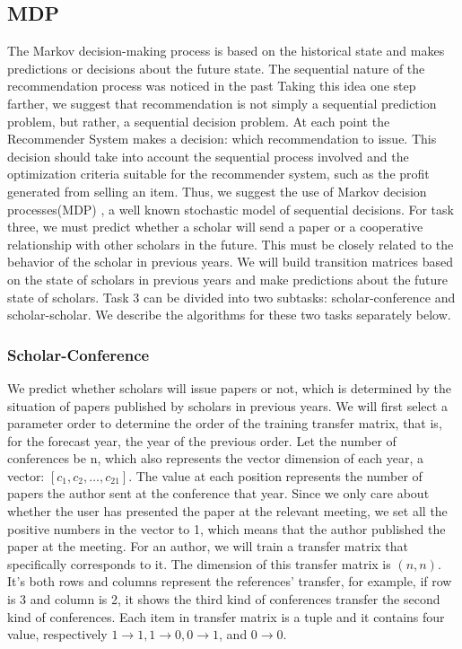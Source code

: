 \documentclass[conference]{IEEEtran}
\begin{document}
\subsection{MDP}
The Markov decision-making process is based on the historical state and makes predictions or decisions about the future state. The sequential nature of the recommendation process was noticed in the past\cite{zimdars2001using} Taking this idea one step farther, we suggest that recommendation is not simply a sequential prediction problem, but rather, a sequential decision problem. At each point the Recommender System makes a decision: which recommendation to issue. This decision should take into account the sequential process involved and the optimization criteria suitable for the recommender system, such as the profit generated from selling an item. Thus, we suggest the use of Markov decision processes(MDP)\cite{rust1994structural} , a well known stochastic model of sequential decisions.\cite{shani2005mdp} For task three, we must predict whether a scholar will send a paper or a cooperative relationship with other scholars in the future. This must be closely related to the behavior of the scholar in previous years. We will build transition matrices based on the state of scholars in previous years and make predictions about the future state of scholars. Task 3 can be divided into two subtasks: scholar-conference and scholar-scholar. We describe the algorithms for these two tasks separately below.\subsubsection{Scholar-Conference}
We predict whether scholars will issue papers or not, which is determined by the situation of papers published by scholars in previous years. We will first select a parameter order to determine the order of the training transfer matrix, that is, for the forecast year, the year of the previous order. Let the number of conferences be n, which also represents the vector dimension of each year, a vector: $[c_1, c_2, \dots, c_{21}]$. The value at each position represents the number of papers the author sent at the conference that year. Since we only care about whether the user has presented the paper at the relevant meeting, we set all the positive numbers in the vector to 1, which means that the author published the paper at the meeting. For an author, we will train a transfer matrix that specifically corresponds to it. The dimension of this transfer matrix is $(n,n)$. It's both rows and columns represent the references' transfer, for example, if row is 3 and column is 2, it shows the third kind of conferences transfer the second kind of conferences. Each item in transfer matrix is a tuple and it contains four value, respectively $1 \rightarrow 1, 1 \rightarrow 0, 0 \rightarrow 1$, and $0 \rightarrow 0$. 
\end{document}
